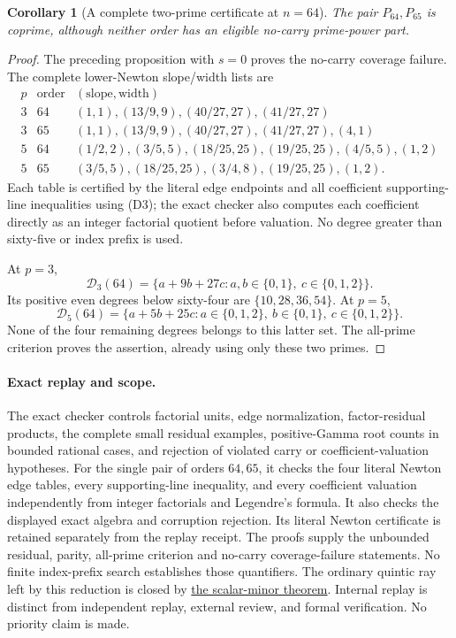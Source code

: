 \documentclass[11pt]{article}
\newtheorem{corollary}[theorem]{Corollary}
\begin{document}
\begin{corollary}[A complete two-prime certificate at $n=64$]\label{cor:quintic-n64-two-prime}
The pair $P_{64},P_{65}$ is coprime, although neither order has
an eligible no-carry prime-power part.
\end{corollary}
\begin{proof}
The preceding proposition with $s=0$ proves the no-carry
coverage failure. The complete lower-Newton slope/width lists are
\[
\begin{array}{c|c|l}
 p&\text{order}&(\text{slope},\text{width})\\\hline
 3&64&(1,1),(13/9,9),(40/27,27),(41/27,27)\\
 3&65&(1,1),(13/9,9),(40/27,27),(41/27,27),(4,1)\\
 5&64&(1/2,2),(3/5,5),(18/25,25),(19/25,25),(4/5,5),(1,2)\\
 5&65&(3/5,5),(18/25,25),(3/4,8),(19/25,25),(1,2).
\end{array}
\]
Each table is certified by the literal edge endpoints and all
coefficient supporting-line inequalities using (D3);
the exact checker also computes each coefficient
directly as an integer factorial quotient before valuation.
No degree greater than sixty-five or index prefix is used.

At $p=3$,
\[
 \mathcal D_3(64)=\{a+9b+27c:
        a,b\in\{0,1\},\ c\in\{0,1,2\}\}.
\]
Its positive even degrees below sixty-four are
$\{10,28,36,54\}$.
At $p=5$,
\[
 \mathcal D_5(64)=\{a+5b+25c:
       a\in\{0,1,2\},\ b\in\{0,1\},\ c\in\{0,1,2\}\}.
\]
None of the four remaining degrees belongs to this latter set.
The all-prime criterion proves the assertion, already using
only these two primes.
\end{proof}

\paragraph{Exact replay and scope.}
The exact checker controls factorial units, edge normalization,
factor-residual products, the complete small residual examples,
positive-Gamma root counts in bounded rational cases, and rejection
of violated carry or coefficient-valuation hypotheses.
For the single pair of orders $64,65$, it checks the four literal
Newton edge tables, every supporting-line inequality, and every
coefficient valuation independently from integer factorials and
Legendre's formula. It also checks the displayed exact algebra and
corruption rejection. Its literal Newton certificate is retained
separately from the replay receipt.
The proofs supply the unbounded residual, parity, all-prime
criterion and no-carry coverage-failure statements. No finite
index-prefix search establishes those quantifiers.
The ordinary quintic ray left by this reduction is closed by \href{QUINTIC_SCALAR_MINOR_SFC.tex}{the scalar-minor theorem}.
Internal replay is distinct from independent replay, external
review, and formal verification. No priority claim is made.
\end{document}
